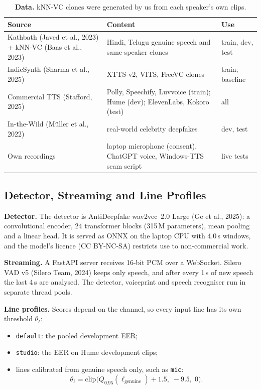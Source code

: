 \documentclass[10pt,a4paper,twocolumn]{article}
\newcommand{\llr}{\ell}
\begin{document}
\begin{table}[t]
\centering\scriptsize
\caption{\textbf{Data.} kNN-VC clones were generated by us from each speaker's own clips.}
\label{tab:data}
\setlength{\tabcolsep}{3pt}
\begin{tabular}{@{}p{}p{}p{}@{}}
\toprule
\textbf{Source} & \textbf{Content} & \textbf{Use}\\
\midrule
Kathbath (Javed et al., 2023) + kNN-VC (Baas et al., 2023) & Hindi, Telugu genuine speech and same-speaker clones & train, dev, test\\
IndicSynth (Sharma et al., 2025) & XTTS-v2, VITS, FreeVC clones & train, baseline\\
Commercial TTS (Stafford, 2025) & Polly, Speechify, Luvvoice (train); Hume (dev); ElevenLabs, Kokoro (test) & all\\
In-the-Wild (M\"uller et al., 2022) & real-world celebrity deepfakes & dev, test\\
Own recordings & laptop microphone (consent), ChatGPT voice, Windows-TTS scam script & live tests\\
\bottomrule
\end{tabular}
\end{table}

\subsection{Detector, Streaming and Line Profiles}
\textbf{Detector.} The detector is AntiDeepfake wav2vec~2.0 Large (Ge et al., 2025): a convolutional encoder, 24 transformer blocks (315\,M parameters), mean pooling and a linear head. It is served as ONNX on the laptop CPU with 4.0\,s windows, and the model's licence (CC BY-NC-SA) restricts use to non-commercial work.

\textbf{Streaming.} A FastAPI server receives 16-bit PCM over a WebSocket. Silero VAD v5 (Silero Team, 2024) keeps only speech, and after every 1\,s of new speech the last 4\,s are analysed. The detector, voiceprint and speech recogniser run in separate thread pools.

\textbf{Line profiles.} Scores depend on the channel, so every input line has its own threshold $\theta_\ell$:
\begin{itemize}\setlength\itemsep{0pt}
\item \texttt{default}: the pooled development EER;
\item \texttt{studio}: the EER on Hume development clips;
\item lines calibrated from genuine speech only, such as \texttt{mic}:
\begin{equation}
\theta_{\ell}=\mathrm{clip}\big(Q_{0.95}(\llr_{\text{genuine}})+1.5,\;-9.5,\;0\big).
\label{eq:calib}
\end{equation}
\end{itemize}
\end{document}
